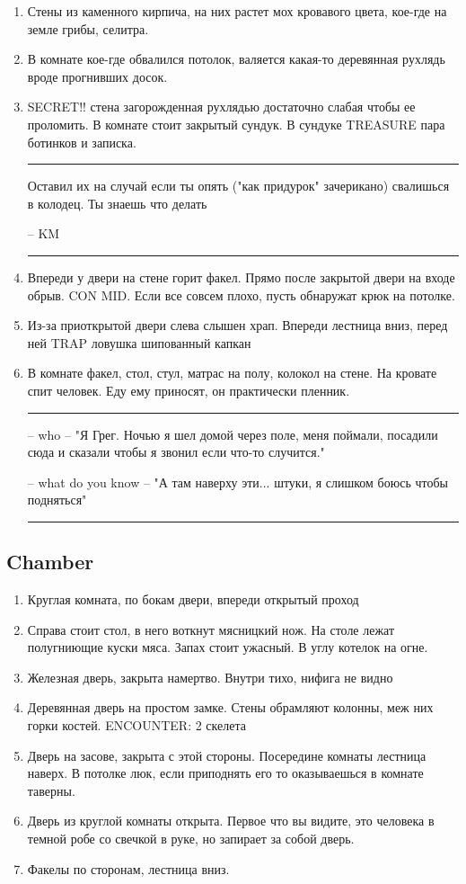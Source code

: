 \documentclass[a5paper,11pt]{book}
\newenvironment{boxed}
{\em\noindent\rule[1ex]{\linewidth}{0.1pt}\linebreak\indent}
{\par\noindent\rule[1ex]{\linewidth}{0.1pt}}
\begin{document}
\begin{multicols}{2}
\begin{enumerate}
\item Стены из каменного кирпича, на них растет мох кровавого цвета, кое-где на земле грибы, селитра.
\item В комнате кое-где обвалился потолок, валяется какая-то деревянная рухлядь вроде прогнивших досок.
\item SECRET!! стена загорожденная рухлядью достаточно слабая чтобы ее проломить. В комнате стоит закрытый сундук. В сундуке TREASURE пара ботинков и записка. 

\begin{boxed}
  Оставил их на случай если ты опять ("как придурок" зачерикано) свалишься в колодец. Ты знаешь что делать 

-- KM
\end{boxed}

\item Впереди у двери на стене горит факел. Прямо после закрытой двери на входе обрыв. CON MID. Если все совсем плохо, пусть обнаружат крюк на потолке.
\item Из-за приоткрытой двери слева слышен храп. Впереди лестница вниз, перед ней TRAP ловушка шипованный капкан
\item В комнате факел, стол, стул, матрас на полу, колокол на стене. На кровате спит человек. Еду ему приносят, он практически пленник. 

\begin{boxed}
-- who -- "Я Грег. Ночью я шел домой через поле, меня поймали, посадили сюда и сказали чтобы я звонил если что-то случится." 

-- what do you know -- "А там наверху эти... штуки, я слишком боюсь чтобы подняться"
\end{boxed}
\end{enumerate}

\subsection{Chamber}
\begin{enumerate}
\item Круглая комната, по бокам двери, впереди открытый проход
\item Справа стоит стол, в него воткнут мясницкий нож. На столе лежат полугниющие куски мяса. Запах стоит ужасный. В углу котелок на огне.
\item Железная дверь, закрыта намертво. Внутри тихо, нифига не видно
\item Деревянная дверь на простом замке. Стены обрамляют колонны, меж них горки костей. ENCOUNTER: 2 скелета
\item Дверь на засове, закрыта с этой стороны. Посередине комнаты лестница наверх. В потолке люк, если приподнять его то оказываешься в комнате таверны.
\item Дверь из круглой комнаты открыта. Первое что вы видите, это человека в темной робе со свечкой в руке, но запирает за собой дверь.
\item Факелы по сторонам, лестница вниз.
\end{enumerate}


\end{multicols}
\end{document}
